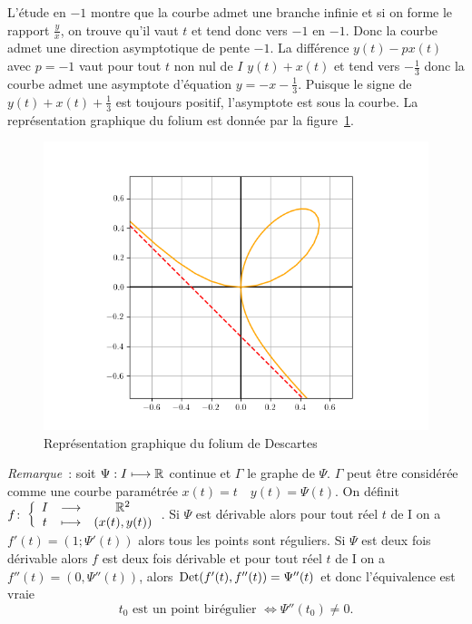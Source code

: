 L'étude en \(-1\) montre que la courbe admet une branche infinie et si on forme
le rapport \(\frac{y}{x}\), on trouve qu'il vaut \(t\) et tend donc vers \(-1\)
en \(-1\). Donc la courbe admet une direction asymptotique de pente \(-1\). La
différence \(y(t)-px(t)\) avec \(p = -1\) vaut pour tout \(t\) non nul de \(I\)
\(y(t)+x(t)\) et tend vers \(-\frac{1}{3}\) donc la courbe admet une asymptote
d'équation \(y = -x-\frac{1}{3}\). Puisque le signe de \(y(t)+x(t)+\frac{1}{3}\)
est toujours positif, l'asymptote est sous la courbe. La représentation
graphique du folium est donnée par la figure~\ref{fig:folium}.

\begin{figure}
  \centering
  \includegraphics[scale = 0.9]{folium.png}
  \caption{Représentation graphique du folium de Descartes}
  \label{fig:folium}
\end{figure}

\emph{Remarque}~:
soit \(\Psi : I \longmapsto \mathbb{R}\) continue et \(\Gamma\) le graphe de \(\Psi\).
\(\Gamma\) peut être considérée comme une courbe paramétrée \(x(t)=t \quad
y(t)=\Psi(t)\). On définit \(f\colon\left\{\begin{array}{ccc}I & \longrightarrow &\mathbb{R}^2\\t & \longmapsto & (x(t),y(t))\end{array}\right.\). Si
\(\Psi\) est dérivable alors pour tout réel \(t\) de I on a
\(f'(t)=(1;\Psi'(t))\) alors tous les points sont réguliers. Si \(\Psi\) est
deux fois dérivable alors \(f\) est deux fois dérivable et pour tout réel \(t\)
de I on a \(f''(t)=(0, \Psi''(t))\), alors \(\operatorname{Det}(f'(t),f''(t))=\Psi''(t)\) et
donc l'équivalence est vraie
\begin{equation}
  t_0 \text{~est un point birégulier } \iff \Psi''(t_0) \neq 0.
\end{equation}

